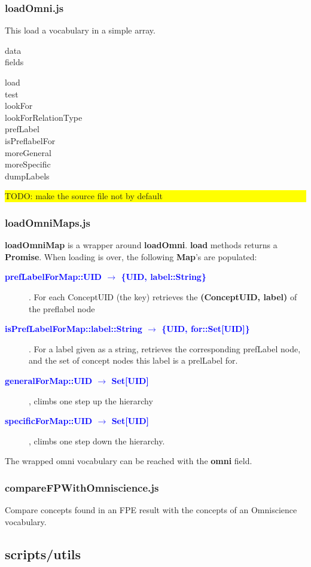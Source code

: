 \documentclass[a4paper,11pt]{report}
\newcommand{\cs}[1]{{\bfseries \ttfamily #1}}
\newcommand{\arrow}[2]{#1 $\rightarrow$ #2}
\newcommand{\fsig}[3]{\textcolor{blue}{\cs{#1::\arrow{#2}{#3}}}}
\newcommand{\sigit}[3]{\item[\fsig{#1}{#2}{#3}]}
\newcommand{\TODO}[1]{\begin{center}\bfseries \colorbox{yellow}{\parbox{0.9\textwidth}{TODO: #1}}\end{center}}
\begin{document}
\subsubsection{loadOmni.js}
This load a vocabulary in a simple array.
\begin{description}
\item[data]
\item[fields]
\end{description}
\begin{description}
\item[load]
\item[test]
\item[lookFor]
\item[lookForRelationType]
\item[prefLabel]
\item[isPreflabelFor]
\item[moreGeneral]
\item[moreSpecific]
\item[dumpLabels]
\end{description}
\TODO{make the source file not by default}
\subsubsection{loadOmniMaps.js}
\cs{loadOmniMap} is a wrapper around \cs{loadOmni}. \cs{load} methods returns a \cs{Promise}. When loading is over, the following \cs{Map}'s are populated:
%
\begin{description}
\sigit{prefLabelForMap}{UID}{\{UID, label::String\}}. For each ConceptUID (the key) retrieves the \cs{(ConceptUID, label)} of the preflabel node
\sigit{isPrefLabelForMap}{label::String}{\{UID, for::Set[UID]\}}. For a label given as a string, retrieves the corresponding prefLabel node, and the set of concept nodes this label is a prelLabel for.
\sigit{generalForMap}{UID}{Set[UID]}, climbs one step up the hierarchy
\sigit{specificForMap}{UID}{Set[UID]}, climbs one step down the hierarchy.
\end{description}
%
The wrapped omni vocabulary can be reached with the \cs{omni} field.
\subsubsection{compareFPWithOmniscience.js}
Compare concepts found in an FPE result with the concepts of an Omniscience vocabulary.
\subsection{scripts/utils}
\end{document}
